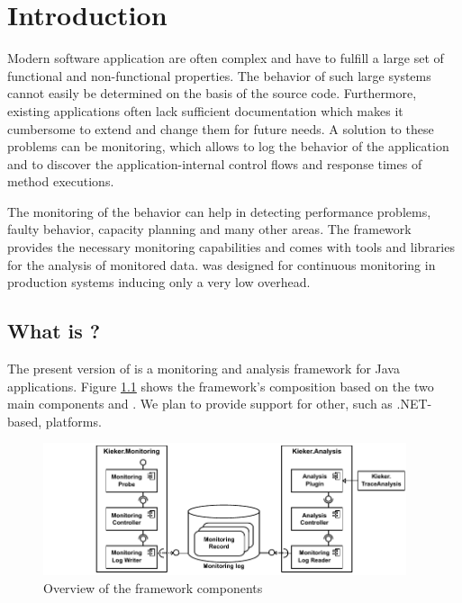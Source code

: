 % 


\chapter{Introduction}\label{chap:introduction}

Modern software application are often complex and have to fulfill a large set of functional and non-functional properties. The behavior of such large systems cannot easily be determined on the basis of the source code. Furthermore, existing applications often lack sufficient documentation which makes it cumbersome to extend and change them for future needs. A solution to these problems can be monitoring, which allows to log the behavior of the application and to discover the application-internal control flows and response times of method executions.

The monitoring of the behavior can help in detecting performance problems, faulty behavior, capacity planning and many other areas. The \Kieker{} framework provides the necessary monitoring capabilities and comes with tools and libraries for the analysis of monitored data. \Kieker{} was designed for %
continuous monitoring in production systems inducing only a very low overhead. 

\section{What is \Kieker?}\label{sec:kieker}

The present version of \Kieker{} is a monitoring and analysis framework for Java applications. Figure \ref{fig:KiekerComponentDiagram} shows the framework's composition based on the two main components \KiekerMonitoringPart{} and \KiekerAnalysisPart{}. %
We plan to provide support for other, such as .NET-based, platforms.

\begin{figure}[H]\centering
\includegraphics[width=0.95\textwidth]{images/kiekerComponentDiagram-woCloud-bw-w-record-newNames-withTraceAnalysis}
\caption{Overview of the framework components}
\label{fig:KiekerComponentDiagram}
\end{figure}
		
